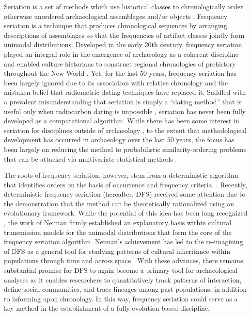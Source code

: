 \documentclass[10pt,letterpaper]{article}
\begin{document}
Seriation is a set of methods which use historical classes to chronologically order otherwise unordered archaeological assemblages and/or objects \cite{Dunnell:1970aa}. Frequency seriation is a technique that produces chronological sequences by arranging descriptions of assemblages so that the frequencies of artifact classes jointly form unimodal distributions. Developed in the early 20th century, frequency seriation played an integral role in the emergence of archaeology as a coherent discipline \cite{lyman1997rise} and enabled culture historians to construct regional chronologies of prehistory throughout the New World \cite{Beals1945,Bluhm1951,Evans1955,Ford1949,Kidder1917,Mayer-Oakes1955,Meggers1957,Phillips1951,Rouse1939,Smith1950}. Yet, for the last 50 years, frequency seriation has been largely ignored due to its association with relative chronology and the mistaken belief that radiometric dating techniques have replaced it. Saddled with a prevalent misunderstanding that seriation is simply a ``dating method'' \cite{Michels1972} that is useful only when radiocarbon dating is impossible \cite{Wikipedia.com2014}, seriation has never been fully developed as a computational algorithm. While there has been some interest in seriation for disciplines outside of archaeology \cite{Arangala2013,Buetow1987,Muller1983Geographic,smith1996seriation}, to the extent that methodological development has occurred in archaeology over the last 50 years, the focus has been largely on reducing the method to probabilistic similarity-ordering problems that can be attacked via multivariate statistical methods \cite{Drennan:1976aa,Duff:1996aa,LeBlanc:1975aa,Marquardt:1978aa,Usman:2003aa}. 

The roots of frequency seriation, however, stem from a deterministic algorithm that identifies orders on the basis of occurrence and frequency criteria. \cite{Dunnell:1970aa}. Recently, deterministic frequency seriation (hereafter, DFS) received some attention due to the demonstration that the method can be theoretically rationalized using an evolutionary framework. While the potential of this idea has been long recognized \cite{Driver1932,Dunnell1978,Dunnell1982}, the work of Neiman \cite{Neiman1995} firmly established an explanatory basis within cultural transmission models for the unimodal distributions that form the core of the frequency seriation algorithm. Neiman's achievement has led to the re-imagining of DFS as a general tool for studying patterns of cultural inheritance within populations through time and across space \cite{Eerkens2005,Eerkens2007,Harpole2002,Kroeber1919,Lipo1997Population,Lipo2001,lyman2006seriation,Mallios2014,o2000applying,Rafferty1994,Rafferty2008,Smith2005,Teltser1995}. With these advances, there remains substantial promise for DFS to again become a primary tool for archaeological analyses as it enables researchers to quantitatively track patterns of interaction, define social communities, and trace lineages among past populations, in addition to informing upon chronology. In this way, frequency seriation could serve as a key method in the establishment of a fully evolution-based discipline.
\end{document}

